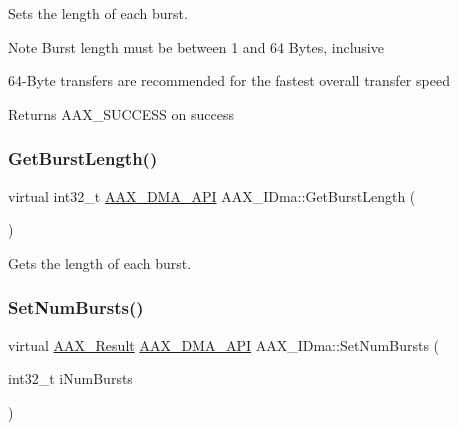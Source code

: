 Sets the length of each burst. 

\begin{DoxyNote}{Note}
Burst length must be between 1 and 64 Bytes, inclusive 

64-\/Byte transfers are recommended for the fastest overall transfer speed
\end{DoxyNote}
\begin{DoxyReturn}{Returns}
{\ttfamily A\+A\+X\+\_\+\+S\+U\+C\+C\+E\+SS} on success 
\end{DoxyReturn}
\mbox{\label{a01809_ac4ded104803ed34131be6924d591f0e6}} 
\subsubsection{\texorpdfstring{GetBurstLength()}{GetBurstLength()}}
{\footnotesize\ttfamily virtual int32\+\_\+t \mbox{\hyperlink{a00587_acae60d01e5e4bd3282369d0d9d378f3f}{A\+A\+X\+\_\+\+D\+M\+A\+\_\+\+A\+PI}} A\+A\+X\+\_\+\+I\+Dma\+::\+Get\+Burst\+Length (\begin{DoxyParamCaption}{ }\end{DoxyParamCaption})\hspace{0.3cm}{\ttfamily [pure virtual]}}



Gets the length of each burst. 

\mbox{\label{a01809_a174fc7382d7f587252f4a9e557830b91}} 
\subsubsection{\texorpdfstring{SetNumBursts()}{SetNumBursts()}}
{\footnotesize\ttfamily virtual \mbox{\hyperlink{a00392_a4d8f69a697df7f70c3a8e9b8ee130d2f}{A\+A\+X\+\_\+\+Result}} \mbox{\hyperlink{a00587_acae60d01e5e4bd3282369d0d9d378f3f}{A\+A\+X\+\_\+\+D\+M\+A\+\_\+\+A\+PI}} A\+A\+X\+\_\+\+I\+Dma\+::\+Set\+Num\+Bursts (\begin{DoxyParamCaption}\item[{int32\+\_\+t}]{i\+Num\+Bursts }\end{DoxyParamCaption})\hspace{0.3cm}{\ttfamily [pure virtual]}}



